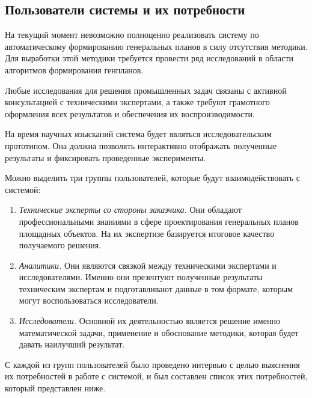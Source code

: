 \subsection{\Large{Пользователи системы и их потребности}}

На текущий момент невозможно полноценно реализовать систему по автоматическому
формированию генеральных планов в силу отсутствия методики.
Для выработки этой методики требуется провести ряд исследований в области
алгоритмов формирования генпланов.

Любые исследования для решения промышленных задач связаны с активной консультацией
с техническими экспертами,
а также требуют грамотного оформления всех результатов и обеспечения их воспроизводимости.

На время научных изысканий система будет являться исследовательским прототипом.
Она должна позволять интерактивно отображать полученные результаты и фиксировать проведенные эксперименты.

Можно выделить три группы пользователей, которые будут взаимодействовать с системой:
\begin{enumerate}
    \item {
        \textit{Технические эксперты со стороны заказчика.} Они обладают профессиональными знаниями в сфере
        проектирования генеральных планов площадных объектов. На их экспертизе базируется итоговое
        качество получаемого решения.
    }
    \item{
        \textit{Аналитики.} Они являются связкой между техническими экспертами и исследователями.
        Именно они презентуют полученные результаты техническим экспертам и подготавливают данные в том формате,
        которым могут воспользоваться исследователи.
    }
    \item{
        \textit{Исследователи.} Основной их деятельностью является решение именно математической задачи,
        применение и обоснование методики, которая будет давать наилучший результат.
    }
\end{enumerate}

С каждой из групп пользователей было проведено интервью с целью выяснения их потребностей в работе с системой,
и был составлен список этих потребностей, который представлен ниже.

